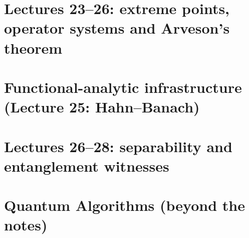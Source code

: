 \documentclass[11pt,a4paper]{article}
\theoremstyle{definition}
\begin{document}
\part{Lectures 23--26: extreme points, operator systems and Arveson's theorem}









\part{Functional-analytic infrastructure (Lecture 25: Hahn--Banach)}




\part{Lectures 26--28: separability and entanglement witnesses}






\part{Quantum Algorithms (beyond the notes)}



































\end{document}
